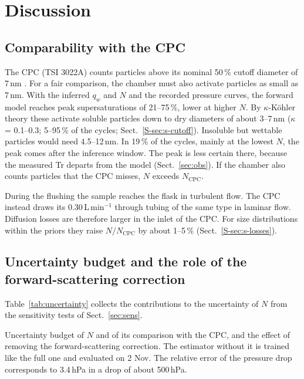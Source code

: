 \documentclass[preprint,review,12pt,authoryear]{elsarticle}
\begin{document}
\section{Discussion}
\label{sec:discussion}
\subsection{Comparability with the CPC}
\label{sec:comparability}
The CPC (TSI 3022A) counts particles above its nominal 50\,\% cutoff diameter of 7\,nm
\citep{sem2002design}. For a fair comparison, the chamber must also activate particles as small as
7\,nm. With the inferred $q_w$ and $N$ and the recorded pressure curves, the
forward model reaches peak supersaturations of 21--75\,\%, lower at higher $N$. By $\kappa$-Köhler
theory these activate soluble particles down to dry diameters of about 3--7\,nm ($\kappa$ = 0.1--0.3;
5--95\,\% of the cycles; Sect.~\ref{S-sec:s-cutoff}). Insoluble but wettable particles would need
4.5--12\,nm. In 19\,\% of the cycles, mainly at the lowest $N$, the peak comes after the inference window.
The peak is less certain there, because the measured Tr departs from the model (Sect.~\ref{sec:obs}). If the
chamber also counts particles that the CPC misses, $N$ exceeds $N_\mathrm{CPC}$.

During the flushing the sample reaches the flask in turbulent flow. The CPC instead draws its
0.30\,L\,min$^{-1}$ through tubing of the same type in laminar flow. Diffusion losses are therefore
larger in the inlet of the CPC. For size distributions within the priors they raise $N/N_\mathrm{CPC}$
by about 1--5\,\% (Sect.~\ref{S-sec:s-losses}).

\subsection{Uncertainty budget and the role of the forward-scattering correction}
\label{sec:budget}
Table~\ref{tab:uncertainty} collects the contributions to the uncertainty of $N$ from the
sensitivity tests of Sect.~\ref{sec:sens}.

\begin{table}[!htbp]
\centering
\caption{Uncertainty budget of $N$ and of its comparison with the CPC, and the effect of removing the
forward-scattering correction. The estimator without it is trained like the full one and evaluated on
2 Nov. The relative error of the pressure drop corresponds to 3.4\,hPa in a drop of about 500\,hPa.}
\label{tab:uncertainty}
\begin{adjustbox}{max width=\textwidth}\small\end{adjustbox}
\end{table}
\end{document}
